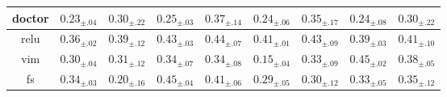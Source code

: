 \begin{table}
{\begin{tabular}{c|c|c|c|c|c|c|c|c|c}
		\multicolumn{2}{c|}{\gls{doctor}} & $\mathbf{0.23}_{\pm .04}$ & $0.30_{\pm .22}$ & $\mathbf{0.25}_{\pm .03}$ & $0.37_{\pm .14}$ & $0.24_{\pm .06}$ & $0.35_{\pm .17}$ & $0.24_{\pm .08}$ & $0.30_{\pm .22}$ \\\hline
		\multicolumn{2}{c|}{\gls{relu}} & $0.36_{\pm .02}$ & $0.39_{\pm .12}$ & $0.43_{\pm .03}$ & $0.44_{\pm .07}$ & $0.41_{\pm .01}$ & $0.43_{\pm .09}$ & $0.39_{\pm .03}$ & $0.41_{\pm .10}$ \\\hline
		\multicolumn{2}{c|}{\gls{vim}} & $0.30_{\pm .04}$ & $0.31_{\pm .12}$ & $0.34_{\pm .07}$ & $0.34_{\pm .08}$ & $\mathbf{0.15}_{\pm .04}$ & $0.33_{\pm .09}$ & $0.45_{\pm .02}$ & $0.38_{\pm .05}$ \\\hline
		\multicolumn{2}{c|}{\gls{fs}} & $0.34_{\pm .03}$ & $0.20_{\pm .16}$ & $0.45_{\pm .04}$ & $0.41_{\pm .06}$ & $0.29_{\pm .05}$ & $0.30_{\pm .12}$ & $0.33_{\pm .05}$ & $0.35_{\pm .12}$ \\\hline
	\end{tabular}%
	}
\end{table}
